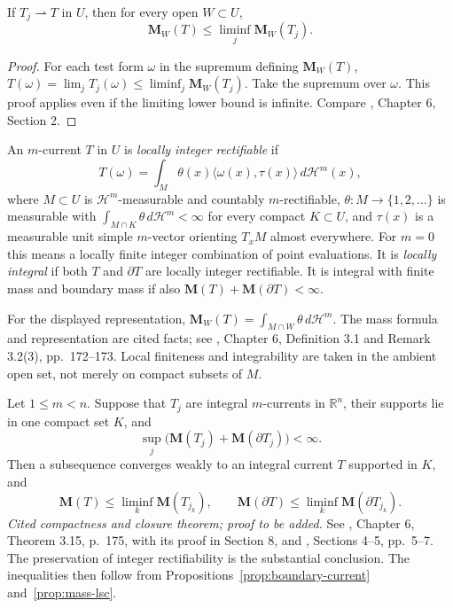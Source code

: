 \begin{proposition}\label{prop:mass-lsc}
If $T_j\rightharpoonup T$ in $U$, then for every open $W\subset U$,
\[
 \mathbf{M}_W(T)\leq\liminf_j\mathbf{M}_W(T_j).
\]
\end{proposition}
\begin{proof}
For each test form $\omega$ in the supremum defining $\mathbf{M}_W(T)$,
$T(\omega)=\lim_jT_j(\omega)\leq\liminf_j\mathbf{M}_W(T_j)$.
Take the supremum over $\omega$. This proof applies even if the limiting lower bound is infinite. Compare \cite{Sim18}, Chapter 6, Section 2.
\end{proof}

\begin{definition}\label{def:integral-current}
An $m$-current $T$ in $U$ is \emph{locally integer rectifiable} if
\[
 T(\omega)=\int_M\theta(x)\langle\omega(x),\tau(x)\rangle\,d\mathcal{H}^m(x),
\]
where $M\subset U$ is $\mathcal{H}^m$-measurable and countably $m$-rectifiable, $\theta:M\to\{1,2,\ldots\}$ is measurable with
$\int_{M\cap K}\theta\,d\mathcal{H}^m<\infty$ for every compact $K\subset U$, and $\tau(x)$ is a measurable unit simple $m$-vector orienting $T_xM$ almost everywhere. For $m=0$ this means a locally finite integer combination of point evaluations. It is \emph{locally integral} if both $T$ and $\partial T$ are locally integer rectifiable. It is integral with finite mass and boundary mass if also $\mathbf{M}(T)+\mathbf{M}(\partial T)<\infty$.

For the displayed representation,
$\mathbf{M}_W(T)=\int_{M\cap W}\theta\,d\mathcal{H}^m$.
The mass formula and representation are cited facts; see \cite{Sim18}, Chapter 6, Definition 3.1 and Remark 3.2(3), pp.~172--173. Local finiteness and integrability are taken in the ambient open set, not merely on compact subsets of $M$.
\end{definition}

\begin{theorem}\label{thm:integral-compactness}
Let $1\leq m<n$. Suppose that $T_j$ are integral $m$-currents in $\mathbb{R}^n$, their supports lie in one compact set $K$, and
\[
 \sup_j\bigl(\mathbf{M}(T_j)+\mathbf{M}(\partial T_j)\bigr)<\infty.
\]
Then a subsequence converges weakly to an integral current $T$ supported in $K$, and
\[
 \mathbf{M}(T)\leq\liminf_k\mathbf{M}(T_{j_k}),\qquad
 \mathbf{M}(\partial T)\leq\liminf_k\mathbf{M}(\partial T_{j_k}).
\]
\emph{Cited compactness and closure theorem; proof to be added.} See \cite{Sim18}, Chapter 6, Theorem 3.15, p.~175, with its proof in Section 8, and \cite{Fle16}, Sections 4--5, pp.~5--7. The preservation of integer rectifiability is the substantial conclusion. The inequalities then follow from Propositions~\ref{prop:boundary-current} and~\ref{prop:mass-lsc}.
\end{theorem}

